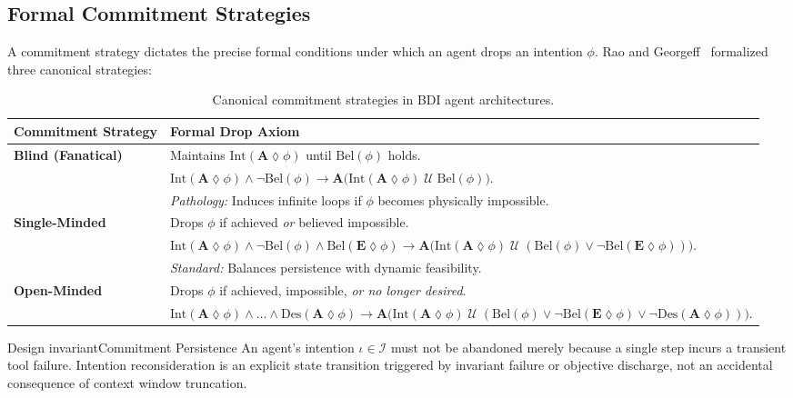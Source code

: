 \documentclass[11pt,a4paper]{article}
\begin{document}
\subsection{Formal Commitment Strategies}

A commitment strategy dictates the precise formal conditions under which an agent drops an intention $\phi$. Rao and Georgeff~ formalized three canonical strategies:

\begin{table}[H]
\centering
\small
\begin{tabularx}{\textwidth}{lX}
\toprule
\textbf{Commitment Strategy} & \textbf{Formal Drop Axiom} \\
\midrule
\textbf{Blind (Fanatical)} & Maintains $\mathrm{Int}(\mathbf{A}\lozenge \phi)$ until $\mathrm{Bel}(\phi)$ holds. \\
& $\mathrm{Int}(\mathbf{A}\lozenge \phi) \land \neg\mathrm{Bel}(\phi) \to \mathbf{A}\big(\mathrm{Int}(\mathbf{A}\lozenge \phi) \;\mathcal{U}\; \mathrm{Bel}(\phi)\big)$. \\
& \emph{Pathology:} Induces infinite loops if $\phi$ becomes physically impossible. \\
\addlinespace[3pt]
\textbf{Single-Minded} & Drops $\phi$ if achieved \emph{or} believed impossible. \\
& $\mathrm{Int}(\mathbf{A}\lozenge \phi) \land \neg\mathrm{Bel}(\phi) \land \mathrm{Bel}(\mathbf{E}\lozenge \phi) \to \mathbf{A}\big(\mathrm{Int}(\mathbf{A}\lozenge \phi) \;\mathcal{U}\; (\mathrm{Bel}(\phi) \lor \neg\mathrm{Bel}(\mathbf{E}\lozenge \phi))\big)$. \\
& \emph{Standard:} Balances persistence with dynamic feasibility. \\
\addlinespace[3pt]
\textbf{Open-Minded} & Drops $\phi$ if achieved, impossible, \emph{or no longer desired}. \\
& $\mathrm{Int}(\mathbf{A}\lozenge \phi) \land \dots \land \mathrm{Des}(\mathbf{A}\lozenge \phi) \to \mathbf{A}\big(\mathrm{Int}(\mathbf{A}\lozenge \phi) \;\mathcal{U}\; (\mathrm{Bel}(\phi) \lor \neg\mathrm{Bel}(\mathbf{E}\lozenge \phi) \lor \neg\mathrm{Des}(\mathbf{A}\lozenge \phi))\big)$. \\
\bottomrule
\end{tabularx}
\caption{Canonical commitment strategies in BDI agent architectures.}
\label{tab:commitment-strategies}
\end{table}

\begin{pdclaim}{Design invariant}{Commitment Persistence}\label{inv:commitment-persistence}
An agent's intention $\iota \in \mathcal{I}$ must not be abandoned merely because a single step incurs a transient tool failure. Intention reconsideration is an explicit state transition triggered by invariant failure or objective discharge, not an accidental consequence of context window truncation.
\end{pdclaim}
\end{document}
